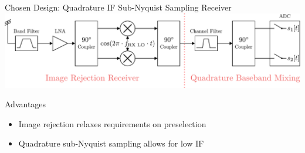 \documentclass[10pt]{beamer}
\begin{document}
\begin{frame}{Chosen Design: \newline Quadrature IF Sub-Nyquist Sampling Receiver}
  \includegraphics[width=\textwidth]{figures/rx_3_bd} \\
  \vspace{5mm}
  \begin{block}{Advantages}
    \begin{itemize}
    \item Image rejection relaxes requirements on preselection
    \item Quadrature sub-Nyquist sampling allows for low IF
    \end{itemize}
  \end{block}
\end{frame}
\end{document}
